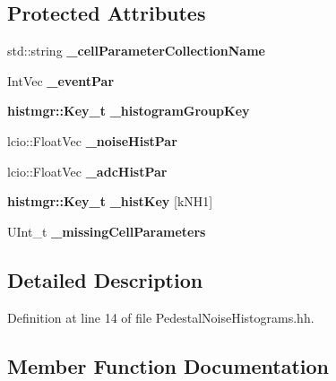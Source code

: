 \subsection*{Protected Attributes}
\begin{DoxyCompactItemize}
\item 
std\-::string {\bfseries \-\_\-cell\-Parameter\-Collection\-Name}\label{classCALICE_1_1PedestalNoiseHistograms_abaadb2fa0bbd710ae117f584641b8fdb}

\item 
Int\-Vec {\bfseries \-\_\-event\-Par}\label{classCALICE_1_1PedestalNoiseHistograms_ae861039b81067ae12a5dea74318f8435}

\item 
{\bf histmgr\-::\-Key\-\_\-t} {\bfseries \-\_\-histogram\-Group\-Key}\label{classCALICE_1_1PedestalNoiseHistograms_af57634693e902aa26716096d357796fe}

\item 
lcio\-::\-Float\-Vec {\bfseries \-\_\-noise\-Hist\-Par}\label{classCALICE_1_1PedestalNoiseHistograms_a5e6e5886b0245d89be77ccc0f116fecb}

\item 
lcio\-::\-Float\-Vec {\bfseries \-\_\-adc\-Hist\-Par}\label{classCALICE_1_1PedestalNoiseHistograms_a79d98a735280c78211ffcb464cd1173a}

\item 
{\bf histmgr\-::\-Key\-\_\-t} {\bfseries \-\_\-hist\-Key} [k\-N\-H1]\label{classCALICE_1_1PedestalNoiseHistograms_a24c5e21337d538e38f8f53d1219bdd91}

\item 
U\-Int\-\_\-t {\bfseries \-\_\-missing\-Cell\-Parameters}\label{classCALICE_1_1PedestalNoiseHistograms_a6e32fc4df33029b95b827bbee5700046}

\end{DoxyCompactItemize}


\subsection{Detailed Description}


Definition at line 14 of file Pedestal\-Noise\-Histograms.\-hh.



\subsection{Member Function Documentation}
